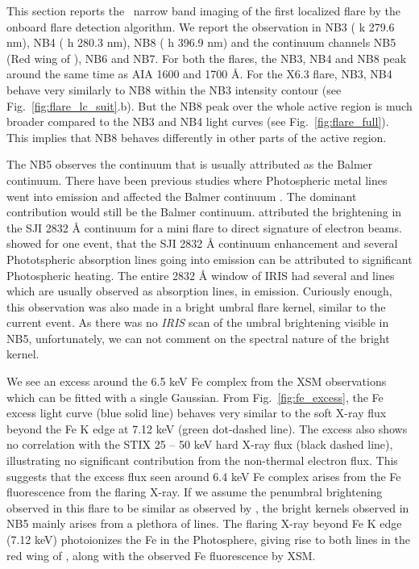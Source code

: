 This section reports the \suit~narrow band imaging of the first localized flare by the onboard flare detection algorithm. We report the observation in NB3 ( k 279.6 nm), NB4 ( h 280.3 nm), NB8 ( h 396.9 nm) and the continuum channels NB5 (Red wing of ), NB6 and NB7. For both the flares, the NB3, NB4 and NB8 peak around the same time as AIA 1600 and 1700 {\AA}. For the X6.3 flare, NB3, NB4 behave very similarly to NB8 within the NB3 intensity contour (see Fig.~\ref{fig:flare_lc_suit}.b). But the NB8 peak over the whole active region is much broader compared to the NB3 and NB4 light curves (see Fig.~\ref{fig:flare_full}). This implies that NB8 behaves differently in other parts of the active region.

The NB5 observes the continuum that is usually attributed as the Balmer continuum. There have been previous studies where Photospheric metal lines went into emission and affected the Balmer continuum \citep{heinzel14,kleint17}. The dominant contribution would still be the Balmer continuum. \cite{reetika21} attributed the brightening in the SJI 2832 {\AA} continuum for a mini flare to direct signature of electron beams. \cite{kowalski19} showed for one event, that the SJI 2832 {\AA} continuum enhancement and several Phototspheric absorption lines going into emission can be attributed to significant Photospheric heating. The entire 2832 {\AA} window of IRIS had several  and  lines which are usually observed as absorption lines, in emission. Curiously enough, this observation was also made in a bright umbral flare kernel, similar to the current event. As there was no {\it IRIS} scan of the umbral brightening visible in NB5, unfortunately, we can not comment on the spectral nature of the bright kernel.

We see an excess around the 6.5 keV Fe complex from the XSM observations which can be fitted with a single Gaussian. From Fig.~\ref{fig:fe_excess}, the Fe excess light curve (blue solid line) behaves very similar to the soft X-ray flux beyond the Fe K edge at 7.12 keV (green dot-dashed line). The excess also shows no correlation with the STIX 25 {--} 50 keV hard X-ray flux (black dashed line), illustrating no significant contribution from the non-thermal electron flux. This suggests that the excess flux seen around 6.4 keV Fe complex arises from the Fe fluorescence from the flaring X-ray. If we assume the penumbral brightening observed in this flare to be similar as observed by \cite{kowalski19}, the bright kernels observed in NB5 mainly arises from a plethora of  lines. The flaring X-ray beyond Fe K edge (7.12 keV) photoionizes the Fe in the Photosphere, giving rise to both  lines in the red wing of , along with the observed Fe fluorescence by XSM. 

